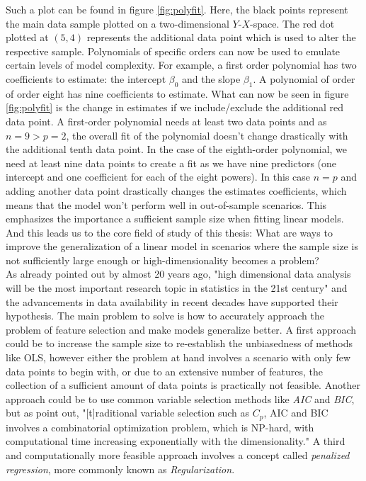 \documentclass[12pt,a4paper]{article}
\begin{document}
Such a plot can be found in figure \ref{fig:polyfit}. Here, the black points represent the main data sample plotted on a two-dimensional $Y$-$X$-space. The red dot plotted at $(5,4)$ represents the additional data point which is used to alter the respective sample. Polynomials of specific orders can now be used to emulate certain levels of model complexity. For example, a first order polynomial has two coefficients to estimate: the intercept $\beta_0$ and the slope $\beta_1$. A polynomial of order of order eight has nine coefficients to estimate. What can now be seen in figure \ref{fig:polyfit} is the change in estimates if we include/exclude the additional red data point. A first-order polynomial needs at least two data points and as $n=9 > p = 2$, the overall fit of the polynomial doesn't change drastically with the additional tenth data point. In the case of the eighth-order polynomial, we need at least nine data points to create a fit as we have nine predictors (one intercept and one coefficient for each of the eight powers). In this case $n=p$ and adding another data point drastically changes the estimates coefficients, which means that the model won't perform well in out-of-sample scenarios. This emphasizes the importance a sufficient sample size when fitting linear models. And this leads us to the core field of study of this thesis: What are ways to improve the generalization of a linear model in scenarios where the sample size is not sufficiently large enough or high-dimensionality becomes a problem?\\

As already pointed out by \textcite{FanLi2006} almost 20 years ago, "high dimensional data analysis will be the most important research topic in statistics in the 21st century" and the advancements in data availability in recent decades have supported their hypothesis. The main problem to solve is how to accurately approach the problem of feature selection and make models generalize better. A first approach could be to increase the sample size to re-establish the unbiasedness of methods like OLS, however either the problem at hand involves a scenario with only few data points to begin with, or due to an extensive number of features, the collection of a sufficient amount of data points is practically not feasible. Another approach could be to use common variable selection methods like \textit{AIC} and \textit{BIC}, but as \textcite{FanLi2006} point out, "[t]raditional variable selection such as $C_p$, AIC and BIC involves a combinatorial optimization problem, which is NP-hard, with computational time increasing exponentially with the dimensionality." A third and computationally more feasible approach involves a concept called \textit{penalized regression}, more commonly known as \textit{Regularization}.
\end{document}
